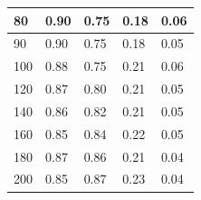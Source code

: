 \documentclass[10pt]{report}
\begin{document}
\begin{figure}[H]
\begin{minipage}[b]{0.5\textwidth}
\begin{flushright}
\begin{tabular}{|l|l|l|l|l|}
    80 & 0.90 & 0.75 & 0.18 & 0.06 \\ \hline
  	90 & 0.90 & 0.75 & 0.18 & 0.05 \\ \hline
  	100 & 0.88 & 0.75 & 0.21 & 0.06 \\ \hline
  	120 & 0.87 & 0.80 & 0.21 & 0.05 \\ \hline
  	140 & 0.86 & 0.82 & 0.21 & 0.05 \\ \hline
  	160 & 0.85 & 0.84 & 0.22 & 0.05 \\ \hline
  	180 & 0.87 & 0.86 & 0.21 & 0.04 \\ \hline
  	200 & 0.85 & 0.87 & 0.23 & 0.04 \\ \hline
\end{tabular}
\end{flushright}\end{minipage}
\end{figure}
\end{document}
